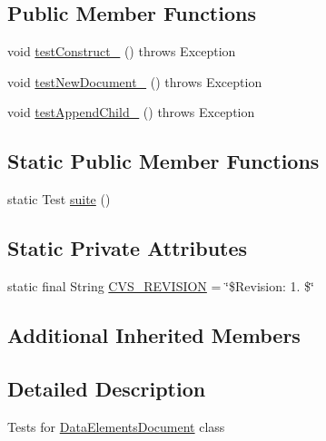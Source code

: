 \subsection*{Public Member Functions}
\begin{DoxyCompactItemize}
\item 
void \hyperlink{classorg_1_1jgap_1_1data_1_1_data_elements_document_test_a876e3ab005112476dff01de71ced9c01}{test\-Construct\-\_} ()  throws Exception 
\item 
void \hyperlink{classorg_1_1jgap_1_1data_1_1_data_elements_document_test_a5049900567ccf8048bb5d31bdb6b35a3}{test\-New\-Document\-\_} ()  throws Exception 
\item 
void \hyperlink{classorg_1_1jgap_1_1data_1_1_data_elements_document_test_ac646fef3c66cc2ff61146587137efa83}{test\-Append\-Child\-\_} ()  throws Exception 
\end{DoxyCompactItemize}
\subsection*{Static Public Member Functions}
\begin{DoxyCompactItemize}
\item 
static Test \hyperlink{classorg_1_1jgap_1_1data_1_1_data_elements_document_test_a3eaf540d40a2bb861221d01f90232854}{suite} ()
\end{DoxyCompactItemize}
\subsection*{Static Private Attributes}
\begin{DoxyCompactItemize}
\item 
static final String \hyperlink{classorg_1_1jgap_1_1data_1_1_data_elements_document_test_adc7856a246c45ef5d0c7339fa1ac0c91}{C\-V\-S\-\_\-\-R\-E\-V\-I\-S\-I\-O\-N} = \char`\"{}\$Revision\-: 1. \$\char`\"{}
\end{DoxyCompactItemize}
\subsection*{Additional Inherited Members}


\subsection{Detailed Description}
Tests for \hyperlink{classorg_1_1jgap_1_1data_1_1_data_elements_document}{Data\-Elements\-Document} class

